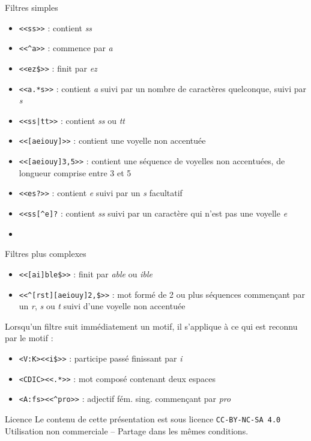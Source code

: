 \documentclass[xetex,xcolor={table,usenames,dvipsnames}]{beamer}
\begin{document}
\begin{frame}{Filtres simples}
	\begin{itemize}
		\item \texttt{<<ss>>} : contient \textit{ss}
		\item \texttt{<<\^{}a>>} : commence par \textit{a}
		\item \texttt{<<ez\${}>>} : finit par \textit{ez}
		\item \texttt{<<a.*s>>} : contient \textit{a} suivi par un nombre de caractères quelconque, suivi par \textit{s}
		\item \texttt{<<ss|tt>>} : contient \textit{ss} ou \textit{tt}
		\item \texttt{<<[aeiouy]>>} : contient une voyelle non accentuée
		\item \texttt{<<[aeiouy]3,5>>} : contient une séquence de voyelles non accentuées, de longueur comprise entre 3 et 5
		\item \texttt{<<es?>>} : contient \textit{e} suivi par un \textit{s} facultatif
		\item \texttt{<<ss[\^{}e]?} : contient \textit{ss} suivi par un caractère qui n'est pas une voyelle \textit{e}
		\item 
	\end{itemize}
\end{frame}

\begin{frame}{Filtres plus complexes}
	\begin{itemize}
		\item \texttt{<<[ai]ble\${}>>} : finit par \textit{able} ou \textit{ible}
		\item \texttt{<<\^{}[rst][aeiouy]{2,}\${}>>} : mot formé de 2 ou plus séquences commençant par un \textit{r}, \textit{s} ou \textit{t} suivi d'une voyelle non accentuée
	\end{itemize}
	
	Lorsqu'un filtre suit immédiatement un motif, il s'applique à ce qui est reconnu par le motif :
	\begin{itemize}
		\item \texttt{<V:K><<i\${}>>} : participe passé finissant par \textit{i}
		\item \texttt{<CDIC><<.*>>} : mot composé contenant deux espaces
		\item \texttt{<A:fs><<\^{}pro>>} : adjectif fém. sing. commençant par \textit{pro}
	\end{itemize}
\end{frame}

\begin{frame}[allowframebreaks]
		\printbibliography
\end{frame}




\begin{frame}{Licence}
	\centering
	{\small Le contenu de cette présentation est sous licence \texttt{CC-BY-NC-SA 4.0}\\Utilisation non commerciale -- Partage dans les mêmes conditions.\\}
	\href{https://creativecommons.org/licenses/by-nc-sa/4.0/deed.fr}{\ccbyncsa}
\end{frame}
\end{document}
